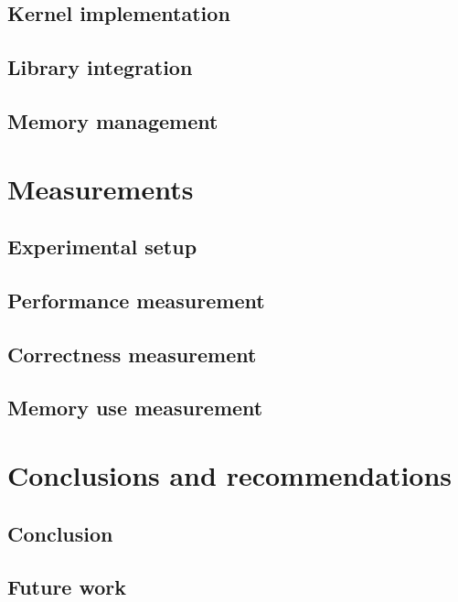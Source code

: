 \documentclass[11pt,a4paper]{report}
\begin{document}
		\section{Kernel implementation}
		
		
		\section{Library integration}
		
		
		\section{Memory management}
		
	
	\chapter{Measurements}
	\label{chap:measurements}
	
	
		\section{Experimental setup}
		
		
		\section{Performance measurement}
		
		
		\section{Correctness measurement}
		
		
		\section{Memory use measurement}
		
	
	\chapter{Conclusions and recommendations}
	\label{chap:ccl}
	
	
		\section{Conclusion}
		
		
		\section{Future work}		
		
	
	\printbibliography
\end{document}
